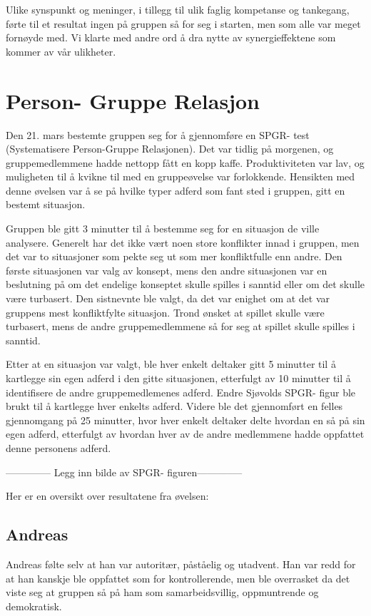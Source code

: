 Ulike synspunkt og meninger, i tillegg til ulik faglig kompetanse og tankegang, førte til et resultat ingen på gruppen så for seg i starten, men som alle var meget fornøyde med. Vi klarte med andre ord å dra nytte av synergieffektene som kommer av vår ulikheter.

\section{Person- Gruppe Relasjon} %
Den 21. mars bestemte gruppen seg for å gjennomføre en SPGR- test (Systematisere Person-Gruppe Relasjonen). Det var tidlig på morgenen, og gruppemedlemmene hadde nettopp fått en kopp kaffe. Produktiviteten var lav, og muligheten til å kvikne til med en gruppeøvelse var forlokkende. Hensikten med denne øvelsen var å se på hvilke typer adferd som fant sted i gruppen, gitt en bestemt situasjon. 

Gruppen ble gitt 3 minutter til å bestemme seg for en situasjon de ville analysere. Generelt har det ikke vært noen store konflikter innad i gruppen, men det var to situasjoner som pekte seg ut som mer konfliktfulle enn andre. Den første situasjonen var valg av konsept, mens den andre situasjonen var en beslutning på om det endelige konseptet skulle spilles i sanntid eller om det skulle være turbasert. Den sistnevnte ble valgt, da det var enighet om at det var gruppens mest konfliktfylte situasjon. Trond ønsket at spillet skulle være turbasert, mens de andre gruppemedlemmene så for seg at spillet skulle spilles i sanntid. 

Etter at en situasjon var valgt, ble hver enkelt deltaker gitt 5 minutter til å kartlegge sin egen adferd i den gitte situasjonen, etterfulgt av 10 minutter til å identifisere de andre gruppemedlemenes adferd. Endre Sjøvolds SPGR- figur ble brukt til å kartlegge hver enkelts adferd. Videre ble det gjennomført en felles gjennomgang på 25 minutter, hvor hver enkelt deltaker delte hvordan en så på sin egen adferd, etterfulgt av hvordan hver av de andre medlemmene hadde oppfattet denne personens adferd. 

-------------- Legg inn bilde av SPGR- figuren--------------

Her er en oversikt over resultatene fra øvelsen:

	\subsection{Andreas}
	Andreas følte selv at han var autoritær, påståelig og utadvent. Han var redd for at han kanskje ble oppfattet som for kontrollerende, men ble overrasket da det viste seg at gruppen så på ham som samarbeidsvillig, oppmuntrende og demokratisk. 

